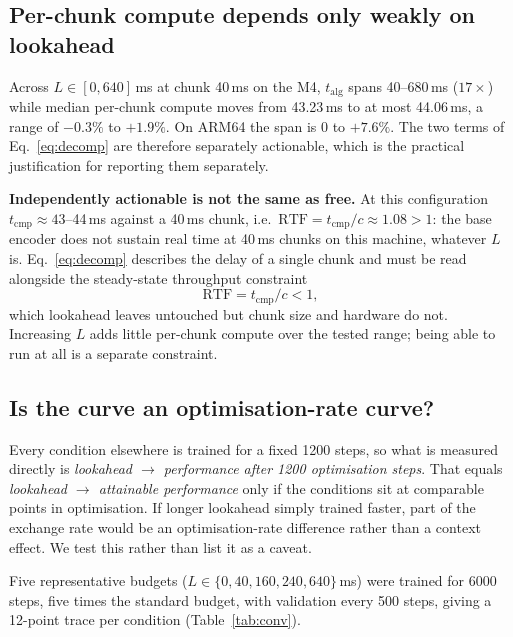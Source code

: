 \documentclass[journal]{IEEEtran}
\newcommand{\talg}{\ensuremath{t_{\mathrm{alg}}}}
\newcommand{\tcmp}{\ensuremath{t_{\mathrm{cmp}}}}
\begin{document}
\subsection{Per-chunk compute depends only weakly on lookahead}
\label{sec:compute}

Across $L\in[0,640]$\,ms at chunk 40\,ms on the M4, \talg{} spans 40--680\,ms
($17\times$) while median per-chunk compute moves from 43.23\,ms to at most
44.06\,ms, a range of $-0.3\%$ to $+1.9\%$. On ARM64 the span is $0$ to
$+7.6\%$. The two terms of Eq.~\ref{eq:decomp} are therefore separately
actionable, which is the practical justification for reporting them
separately.

\textbf{Independently actionable is not the same as free.} At this
configuration $\tcmp{}\approx43$--44\,ms against a 40\,ms chunk, i.e.\
$\mathrm{RTF}=\tcmp/c\approx1.08>1$: the base encoder does not sustain real
time at 40\,ms chunks on this machine, whatever $L$ is. Eq.~\ref{eq:decomp}
describes the delay of a single chunk and must be read alongside the
steady-state throughput constraint
\begin{equation}
\mathrm{RTF} = \tcmp / c < 1,
\label{eq:rtf}
\end{equation}
which lookahead leaves untouched but chunk size and hardware do not. Increasing $L$ adds little per-chunk compute over the tested range;
being able to run at all is a separate constraint.

\subsection{Is the curve an optimisation-rate curve?}
\label{sec:convergence}

Every condition elsewhere is trained for a fixed 1200 steps, so what is
measured directly is \emph{lookahead $\rightarrow$ performance after 1200
optimisation steps}. That equals \emph{lookahead $\rightarrow$ attainable
performance} only if the conditions sit at comparable points in optimisation.
If longer lookahead simply trained faster, part of the exchange rate would be
an optimisation-rate difference rather than a context effect. We test this
rather than list it as a caveat.

Five representative budgets ($L\in\{0,40,160,240,640\}$\,ms) were trained for
6000 steps, five times the standard budget, with validation every 500
steps, giving a 12-point trace per condition (Table~\ref{tab:conv}).
\end{document}
